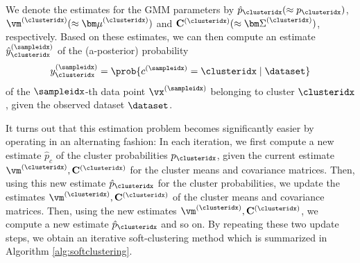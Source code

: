\documentclass[12pt]{report}
\begin{document}
We denote the estimates for the GMM parameters by $\hat{p}_{\clusteridx} (\approx p_{\clusteridx})$, $\vm^{(\clusteridx)} (\approx {\bm \mu}^{(\clusteridx)})$ and 
$\mathbf{C}^{(\clusteridx)} (\approx {\bm \Sigma}^{(\clusteridx)})$, respectively. 
Based on these estimates, we can then compute an estimate $\hat{y}_{\clusteridx}^{(\sampleidx)}$ 
of the (a-posterior) probability 
\begin{equation} 
y_{\clusteridx}^{(\sampleidx)} = \prob{c^{(\sampleidx)} = \clusteridx \mid \dataset }
\end{equation} 
of the $\sampleidx$-th data point $\vx^{(\sampleidx)}$ belonging to cluster $\clusteridx$, given the observed dataset $\dataset$. 

It turns out that this estimation problem becomes significantly easier by operating in an alternating 
fashion: In each iteration, we first compute a new estimate $\hat{p}_{c}$ of the cluster probabilities 
$p_{\clusteridx}$, given the current estimate $\vm^{(\clusteridx)}, \mathbf{C}^{(\clusteridx)}$ for the 
cluster means and covariance matrices. Then, using this new estimate $\hat{p}_{\clusteridx}$ for the 
cluster probabilities, we update the estimates $\vm^{(\clusteridx)}, \mathbf{C}^{(\clusteridx)}$ of the 
cluster means and covariance matrices. Then, using the new estimates $\vm^{(\clusteridx)}, \mathbf{C}^{(\clusteridx)}$, 
we compute a new estimate $\hat{p}_{\clusteridx}$ and so on. By repeating these two update steps, 
we obtain an iterative soft-clustering method which is summarized in Algorithm \ref{alg:softclustering}. 
\end{document}
